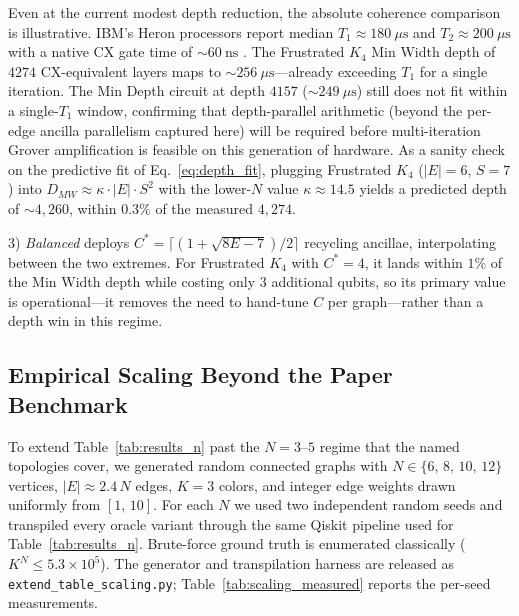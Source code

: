 \documentclass{ieeeaccess}
\begin{document}
Even at the current modest depth reduction, the absolute coherence comparison is illustrative. IBM's Heron processors report median $T_1 \approx 180~\mu\mathrm{s}$ and $T_2 \approx 200~\mu\mathrm{s}$ with a native CX gate time of $\sim 60~\mathrm{ns}$ \cite{ibmheron}. The Frustrated $K_4$ Min Width depth of $4274$ CX-equivalent layers maps to $\sim 256~\mu\mathrm{s}$---already exceeding $T_1$ for a single iteration. The Min Depth circuit at depth $4157$ ($\sim 249~\mu\mathrm{s}$) still does not fit within a single-$T_1$ window, confirming that depth-parallel arithmetic (beyond the per-edge ancilla parallelism captured here) will be required before multi-iteration Grover amplification is feasible on this generation of hardware. As a sanity check on the predictive fit of Eq.~\eqref{eq:depth_fit}, plugging Frustrated $K_4$ ($|E|=6$, $S=7$) into $D_{MW} \approx \kappa \cdot |E| \cdot S^2$ with the lower-$N$ value $\kappa \approx 14.5$ yields a predicted depth of $\sim 4{,}260$, within $0.3\%$ of the measured $4{,}274$.

3) \emph{Balanced} deploys $C^{*} = \lceil(1 + \sqrt{8E-7})/2\rceil$ recycling ancillae, interpolating between the two extremes. For Frustrated $K_4$ with $C^* = 4$, it lands within $1\%$ of the Min Width depth while costing only $3$ additional qubits, so its primary value is operational---it removes the need to hand-tune $C$ per graph---rather than a depth win in this regime.

\subsection{Empirical Scaling Beyond the Paper Benchmark}
\label{sec:scaling_measured}

To extend Table~\ref{tab:results_n} past the $N{=}3$--$5$ regime that the named topologies cover, we generated random connected graphs with $N \in \{6,\,8,\,10,\,12\}$ vertices, $|E| \approx 2.4\,N$ edges, $K = 3$ colors, and integer edge weights drawn uniformly from $[1,\,10]$. For each $N$ we used two independent random seeds and transpiled every oracle variant through the same Qiskit pipeline used for Table~\ref{tab:results_n}. Brute-force ground truth is enumerated classically ($K^N \le 5.3 \times 10^5$). The generator and transpilation harness are released as \texttt{extend\_table\_scaling.py}; Table~\ref{tab:scaling_measured} reports the per-seed measurements.
\end{document}
